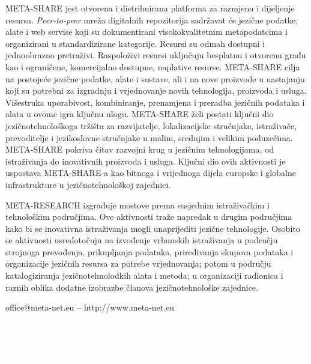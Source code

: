 \begin{multicols}{2}
META-SHARE jest otvorena i distribuirana platforma za razmjenu i dijeljenje resursa. \emph{Peer-to-peer} mreža digitalnih repozitorija sadržavat će jezične podatke, alate i web servise koji su dokumentirani visokokvalitetnim metapodatcima i organizirani u standardizirane kategorije. Resursi su odmah dostupni i jednoobrazno pretraživi. Raspoloživi resursi uključuju besplatnu i otvorenu građu kao i ograničene, komercijalno dostupne, naplative resurse. META-SHARE cilja na postojeće jezične podatke, alate i sustave, ali i na nove proizvode u nastajanju koji su potrebni za izgradnju i vrjednovanje novih tehnologija, proizvoda i usluga. Višestruka uporabivost, kombiniranje, prenamjena i preradba jezičnih podataka i alata u ovome igra ključnu ulogu. META-SHARE želi postati ključni dio jezičnotehnološkoga tržišta za razvijatelje, lokalizacijske stručnjake, istraživače, prevoditelje i jezikoslovne stručnjake u malim, srednjim i velikim poduzećima. META-SHARE pokriva čitav razvojni krug u jezičnim tehnologijama, od istraživanja do inovativnih proizvoda i usluga. Ključni dio ovih aktivnosti je uspostava META-SHARE-a kao bitnoga i vrijednoga dijela europske i globalne infrastrukture u jezičnotehnološkoj zajednici.

META-RESEARCH izgrađuje mostove prema susjednim istraživačkim i tehnološkim područjima. Ove aktivnosti traže napredak u drugim područjima kako bi se inovativna istraživanja mogli unaprijediti jezične tehnologije. Osobito se aktivnosti usredotočuju na izvođenje vrhunskih istraživanja u području strojnoga prevođenja, prikupljanja podataka, priređivanja skupova podataka i organizacije jezičnih resursa za potrebe vrjednovanja; potom u području katalogiziranja jezičnotehnolođkih alata i metoda; u organizaciji radionica i raznih oblika dodatne izobrazbe članova jezičnotehnološke zajednice.


\centerline{office@meta-net.eu -- http://www.meta-net.eu}

\end{multicols}

\vfill

\makeatletter
{}
{
  \renewcommand*{\theHsection}{\thepart.\thesection}}
\makeatother
\part*{\textcolor{white}{English}}
\setcounter{section}{0}
\setcounter{figure}{0}


